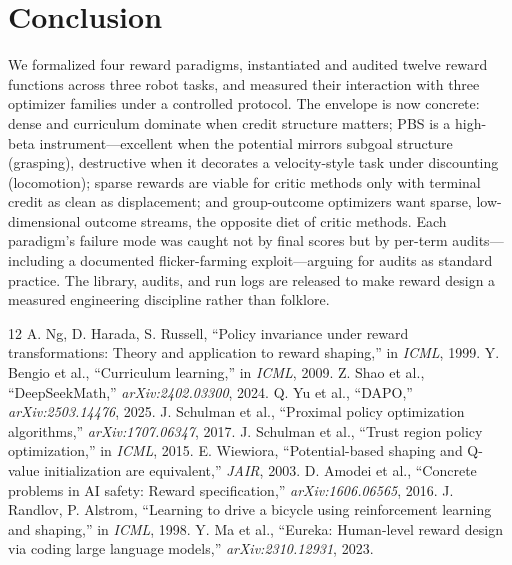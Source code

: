 \documentclass[journal,twoside]{IEEEtran}
\begin{document}
\section{Conclusion}
We formalized four reward paradigms, instantiated and audited twelve reward
functions across three robot tasks, and measured their interaction with
three optimizer families under a controlled protocol. The envelope is now
concrete: dense and curriculum dominate when credit structure matters;
PBS is a high-beta instrument---excellent when the potential mirrors
subgoal structure (grasping), destructive when it decorates a
velocity-style task under discounting (locomotion); sparse rewards are
viable for critic methods only with terminal credit as clean as
displacement; and group-outcome optimizers want sparse, low-dimensional
outcome streams, the opposite diet of critic methods. Each paradigm's
failure mode was caught not by final scores but by per-term audits---%
including a documented flicker-farming exploit---arguing for audits as
standard practice. The library, audits, and run logs are released
to make reward design a measured engineering discipline rather than
folklore.


\begin{thebibliography}{12}
 A. Ng, D. Harada, S. Russell, ``Policy invariance
under reward transformations: Theory and application to reward shaping,''
in \emph{ICML}, 1999.
 Y. Bengio et al., ``Curriculum learning,''
in \emph{ICML}, 2009.
 Z. Shao et al., ``DeepSeekMath,''
\emph{arXiv:2402.03300}, 2024.
 Q. Yu et al., ``DAPO,''
\emph{arXiv:2503.14476}, 2025.
 J. Schulman et al., ``Proximal policy
optimization algorithms,'' \emph{arXiv:1707.06347}, 2017.
 J. Schulman et al., ``Trust region policy
optimization,'' in \emph{ICML}, 2015.
 E. Wiewiora, ``Potential-based shaping
and Q-value initialization are equivalent,'' \emph{JAIR}, 2003.
 D. Amodei et al., ``Concrete problems in AI
safety: Reward specification,'' \emph{arXiv:1606.06565}, 2016.
 J. Randlov, P. Alstrom, ``Learning to drive a
bicycle using reinforcement learning and shaping,'' in \emph{ICML}, 1998.
 Y. Ma et al., ``Eureka: Human-level reward design via
coding large language models,'' \emph{arXiv:2310.12931}, 2023.
\end{thebibliography}
\end{document}
